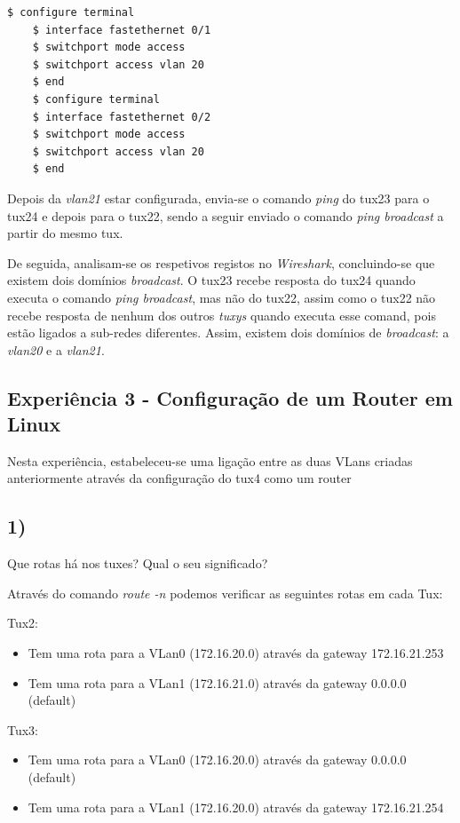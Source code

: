 \documentclass[11pt]{article}
\begin{document}
\begin{lstlisting}[language=bash]
    $ configure terminal
    $ interface fastethernet 0/1
    $ switchport mode access
    $ switchport access vlan 20
    $ end
    $ configure terminal
    $ interface fastethernet 0/2            
    $ switchport mode access
    $ switchport access vlan 20
    $ end
\end{lstlisting}

Depois da \textit{vlan21} estar configurada, envia-se o comando \textit{ping} do tux23 para o tux24 e depois para o tux22, sendo a seguir enviado o comando \textit{ping broadcast} a partir do mesmo tux.

De seguida, analisam-se os respetivos registos no \textit{Wireshark}, concluindo-se que existem dois domínios \textit{broadcast}. O tux23 recebe resposta do tux24 quando executa o comando \textit{ping broadcast}, mas não do tux22, assim como o tux22 não recebe resposta de nenhum dos outros \textit{tuxys} quando executa esse comand, pois estão ligados a sub-redes diferentes. Assim, existem dois domínios de \textit{broadcast}: a \textit{vlan20} e a \textit{vlan21}. 

\subsection{Experiência 3 - Configuração de um Router em Linux}

Nesta experiência, estabeleceu-se uma ligação entre as duas VLans criadas anteriormente através da configuração do tux4 como um router

\subsection{1)} Que rotas há nos tuxes? Qual o seu significado?

Através do comando \emph{route -n} podemos verificar as seguintes rotas em cada Tux:


Tux2:
\begin{itemize}
\item Tem uma rota para a VLan0 (172.16.20.0) através da gateway 172.16.21.253
\item Tem uma rota para a VLan1 (172.16.21.0) através da gateway 0.0.0.0 (default)

\end{itemize}

Tux3:
\begin{itemize}
\item Tem uma rota para a VLan0 (172.16.20.0) através da gateway 0.0.0.0 (default)
\item Tem uma rota para a VLan1 (172.16.20.0) através da gateway 172.16.21.254

\end{itemize}
\end{document}

